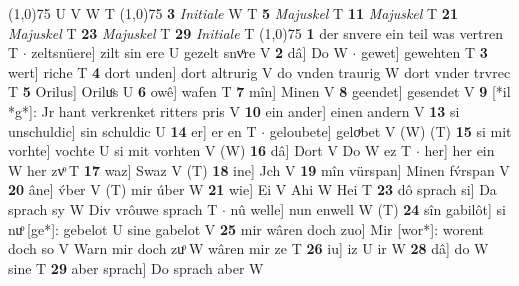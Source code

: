 \documentclass[8pt,a4paper,notitlepage]{article}
\begin{document}
\begin{table}[ht]
\begin{minipage}[t]{0.5\linewidth}
\scriptsize
\line(1,0){75} \newline
U V W T \newline
\line(1,0){75} \newline
\textbf{3} \textit{Initiale} W T  \textbf{5} \textit{Majuskel} T  \textbf{11} \textit{Majuskel} T  \textbf{21} \textit{Majuskel} T  \textbf{23} \textit{Majuskel} T  \textbf{29} \textit{Initiale} T  \newline
\line(1,0){75} \newline
\textbf{1} der snvere ein teil was vertren T  $\cdot$ zeltsnüere] zilt sin ere U gezelt snvͤre V \textbf{2} dâ] Do W  $\cdot$ gewet] gewehten T \textbf{3} wert] riche T \textbf{4} dort unden] dort altrurig V do vnden traurig W dort vnder trvrec T \textbf{5} Orilus] Oriluͦs U \textbf{6} owê] wafen T \textbf{7} mîn] Minen V \textbf{8} geendet] gesendet V \textbf{9} [*il *g*]: Jr hant verkrenket ritters pris V \textbf{10} ein ander] einen andern V \textbf{13} si unschuldic] sin schuldic U \textbf{14} er] er en T  $\cdot$ geloubete] geloͮbet V (W) (T) \textbf{15} si mit vorhte] vochte U si mit vorhten V (W) \textbf{16} dâ] Dort V Do W ez T  $\cdot$ her] her ein W her zvͦ T \textbf{17} waz] Swaz V (T) \textbf{18} ine] Jch V \textbf{19} mîn vürspan] Minen fv́rspan V \textbf{20} âne] v́ber V (T) mir úber W \textbf{21} wie] Ei V Ahi W Hei T \textbf{23} dô sprach si] Da sprach sy W Div vrôuwe sprach T  $\cdot$ nû welle] nun enwell W (T) \textbf{24} sîn gabilôt] si nuͦ [ge*]: gebelot U sine gabelot V \textbf{25} mir wâren doch zuo] Mir [wor*]: worent doch so V Warn mir doch zuͦ W wâren mir ze T \textbf{26} iu] iz U ir W \textbf{28} dâ] do W sine T \textbf{29} aber sprach] Do sprach aber W \newline
\end{minipage}
\end{table}
\end{document}
